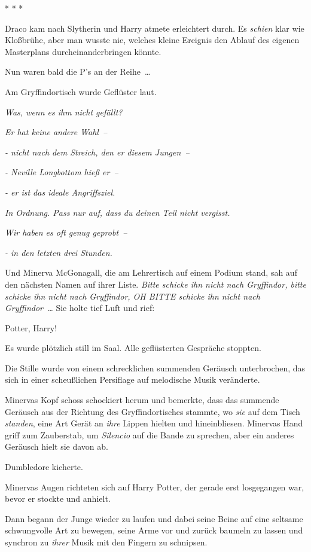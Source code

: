 * * *

Draco kam nach Slytherin und Harry atmete erleichtert durch. Es \emph{schien}
klar wie Kloßbrühe, aber man wusste nie, welches kleine Ereignis den Ablauf des
eigenen Masterplans durcheinanderbringen könnte.

Nun waren bald die P’s an der Reihe …

Am Gryffindortisch wurde Geflüster laut.

\emph{\glqq{}Was, wenn es ihm nicht gefällt?\grqq{}}

\emph{\grqq{} Er hat keine andere Wahl –\grqq{}}

\emph{\grqq{} - nicht nach dem Streich, den er diesem Jungen –\grqq{}}

\emph{\grqq{} - Neville Longbottom hieß er –\grqq{}}

\emph{\grqq{} - er ist das ideale Angriffsziel.\grqq{}}

\emph{\grqq{} In Ordnung. Pass nur auf, dass du deinen Teil nicht
vergisst.\grqq{}}

\emph{\grqq{} Wir haben es oft genug geprobt –\grqq{}}

\emph{\grqq{} - in den letzten drei Stunden.\grqq{}}

Und Minerva McGonagall, die am Lehrertisch auf einem Podium stand, sah auf den
nächsten Namen auf ihrer Liste. \emph{Bitte schicke ihn nicht nach Gryffindor,
bitte schicke ihn nicht nach Gryffindor, OH BITTE schicke ihn nicht nach
Gryffindor …} Sie holte tief Luft und rief:

\grqq{} Potter, Harry!\grqq{}

Es wurde plötzlich still im Saal. Alle geflüsterten Gespräche stoppten.

Die Stille wurde von einem schrecklichen summenden Geräusch unterbrochen, das
sich in einer scheußlichen Persiflage auf melodische Musik veränderte.

Minervas Kopf schoss schockiert herum und bemerkte, dass das summende Geräusch
aus der Richtung des Gryffindortisches stammte, wo \emph{sie} auf dem Tisch
\emph{standen}, eine Art Gerät an \emph{ihre} Lippen hielten und hineinbliesen.
Minervas Hand griff zum Zauberstab, um \emph{Silencio} auf die Bande zu
sprechen, aber ein anderes Geräusch hielt sie davon ab.

Dumbledore kicherte.

Minervas Augen richteten sich auf Harry Potter, der gerade erst losgegangen war,
bevor er stockte und anhielt.

Dann begann der Junge wieder zu laufen und dabei seine Beine auf eine seltsame
schwungvolle Art zu bewegen, seine Arme vor und zurück baumeln zu lassen und
synchron zu \emph{ihrer} Musik mit den Fingern zu schnipsen.

